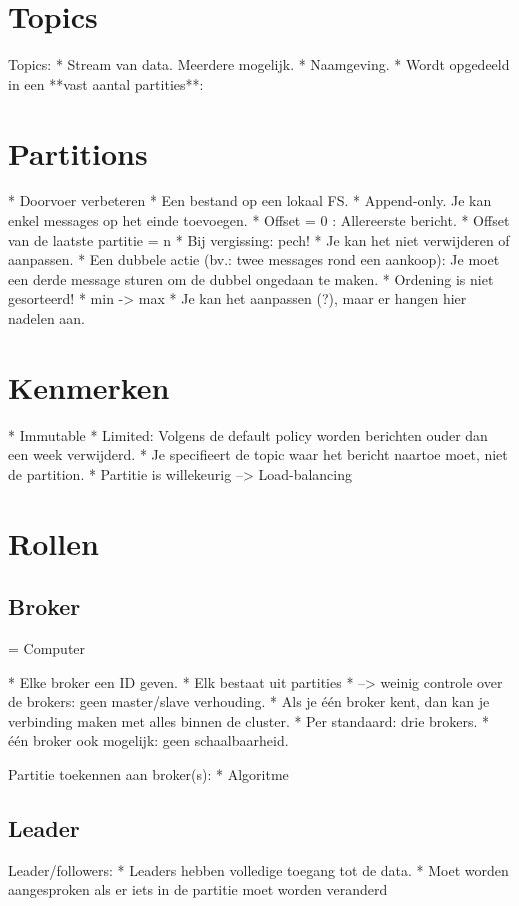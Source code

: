 \documentclass[a4paper,10pt,twoside]{report}
\begin{document}
\section{Topics}
Topics:
* Stream van data. Meerdere mogelijk.
* Naamgeving.
* Wordt opgedeeld in een **vast aantal partities**:

\section{Partitions}
* Doorvoer verbeteren
* Een bestand op een lokaal FS.
* Append-only. Je kan enkel messages op het einde toevoegen.
* Offset = 0 : Allereerste bericht. 
* Offset van de laatste partitie = n
* Bij vergissing: pech!
*  Je kan het niet verwijderen of aanpassen.
*  Een dubbele actie (bv.: twee messages rond een aankoop): Je moet een derde message sturen om de dubbel ongedaan te maken.
* Ordening is niet gesorteerd!
* min -> max
* Je kan het aanpassen (?), maar er hangen hier nadelen aan.


\section{Kenmerken}
* Immutable
* Limited: Volgens de default policy worden berichten ouder dan een week verwijderd.
* Je specifieert de topic waar het bericht naartoe moet, niet de partition.
* Partitie is willekeurig --> Load-balancing

\section{Rollen}

\subsection{Broker}
= Computer

* Elke broker een ID geven.
* Elk bestaat uit partities 
* --> weinig controle over de brokers: geen master/slave verhouding.
* Als je één broker kent, dan kan je verbinding maken met alles binnen de cluster.
* Per standaard: drie brokers.
* één broker ook mogelijk: geen schaalbaarheid.

Partitie toekennen aan broker(s):
* Algoritme

\subsection{Leader}

Leader/followers:
* Leaders hebben volledige toegang tot de data.
* Moet worden aangesproken als er iets in de partitie moet worden veranderd
\end{document}
